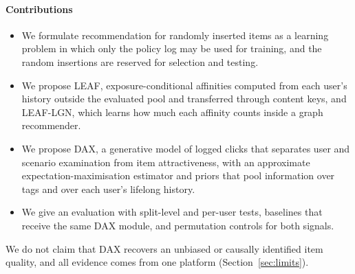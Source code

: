 \paragraph{Contributions}
\begin{itemize}
\item We formulate recommendation for randomly inserted items as a learning problem in which only the policy log may be used for
  training, and the random insertions are reserved for selection and testing.
\item We propose LEAF, exposure-conditional affinities computed from each user's history outside the evaluated pool and transferred
  through content keys, and LEAF-LGN, which learns how much each affinity counts inside a graph recommender.
\item We propose DAX, a generative model of logged clicks that separates user and scenario examination from item attractiveness,
  with an approximate expectation-maximisation estimator and priors that pool information over tags and over each user's lifelong history.
\item We give an evaluation with split-level and per-user tests, baselines that receive the same DAX module, and permutation controls
  for both signals.
\end{itemize}
We do not claim that DAX recovers an unbiased or causally identified item quality, and all evidence comes from one platform
(Section~\ref{sec:limits}).
